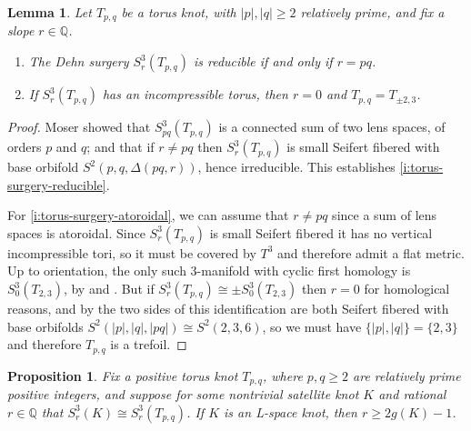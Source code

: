 \documentclass[11pt]{amsart}
\newtheorem {lemma}[theorem]{Lemma}
\newtheorem {proposition}[theorem]{Proposition}
\numberwithin{equation}{section}
\numberwithin{theorem}{section}
\theoremstyle{definition}
\newcommand{\Q}{\mathbb{Q}}
\begin{document}
\begin{lemma} \label{lem:torus-surgery-essential}
Let $T_{p,q}$ be a torus knot, with $|p|,|q| \geq 2$ relatively prime, and fix a slope $r \in \Q$.
\begin{enumerate}
\item The Dehn surgery $S^3_r(T_{p,q})$ is reducible if and only if $r=pq$. \label{i:torus-surgery-reducible}
\item If $S^3_r(T_{p,q})$ has an incompressible torus, then $r=0$ and $T_{p,q} = T_{\pm 2,3}$. \label{i:torus-surgery-atoroidal}
\end{enumerate}
\end{lemma}

\begin{proof}
Moser \cite{moser} showed that $S^3_{pq}(T_{p,q})$ is a connected sum of two lens spaces, of orders $p$ and $q$; and that if $r \neq pq$ then $S^3_r(T_{p,q})$ is small Seifert fibered with base orbifold $S^2(p,q,\Delta(pq,r))$, hence irreducible.  This establishes \eqref{i:torus-surgery-reducible}.

For \eqref{i:torus-surgery-atoroidal}, we can assume that $r \neq pq$ since a sum of lens spaces is atoroidal.  Since $S^3_r(T_{p,q})$ is small Seifert fibered it has no vertical incompressible tori, so it must be covered by $T^3$ \cite[Corollary~10.4.13]{martelli} and therefore admit a flat metric.  Up to orientation, the only such $3$-manifold with cyclic first homology is $S^3_0(T_{2,3})$, by \cite[Theorem~12.3.1]{martelli} and \cite[Proposition~10.3.38]{martelli}.  But if $S^3_r(T_{p,q}) \cong \pm S^3_0(T_{2,3})$ then $r=0$ for homological reasons, and by \cite{moser} the two sides of this identification are both Seifert fibered with base orbifolds $S^2(|p|,|q|,|pq|) \cong S^2(2,3,6)$, so we must have $\{|p|,|q|\} = \{2,3\}$ and therefore $T_{p,q}$ is a trefoil.
\end{proof}

\begin{proposition} \label{prop:compare-satellite-surgeries}
Fix a positive torus knot $T_{p,q}$, where $p,q\geq 2$ are relatively prime positive integers, and suppose for some nontrivial satellite knot $K$ and rational $r \in \Q$ that $S^3_r(K) \cong S^3_r(T_{p,q})$.  If $K$ is an L-space knot, then $r \geq 2g(K)-1$.
\end{proposition}
\end{document}
